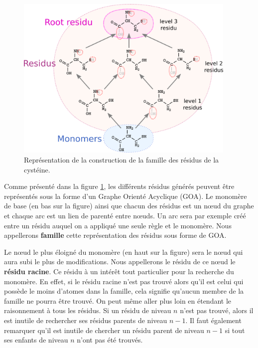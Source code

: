 \begin{figure}[!ht]
  \begin{center}
    \includegraphics[width=400px]{Figures/s2m/residues/cystein_family.png}
    \caption{\label{family}Représentation de la construction de la famille des résidus de la cystéine.}
  \end{center}
\end{figure}

Comme présenté dans la figure \ref{family}, les différents résidus générés peuvent être représentés sous la forme d'un Graphe Orienté Acyclique (GOA).
Le monomère de base (en bas sur la figure) ainsi que chacun des résidus est un n\oe{}ud du graphe et chaque arc est un lien de parenté entre n\oe{}uds.
Un arc sera par exemple créé entre un résidu auquel on a appliqué une seule règle et le monomère.
Nous appellerons \textbf{famille} cette représentation des résidus sous forme de GOA.

Le n\oe{}ud le plus éloigné du monomère (en haut sur la figure) sera le n\oe{}ud qui aura subi le plus de modifications.
Nous appellerons le résidu de ce n\oe{}ud le \textbf{résidu racine}.
Ce résidu à un intérêt tout particulier pour la recherche du monomère.
En effet, si le résidu racine n'est pas trouvé alors qu'il est celui qui possède le moins d'atomes dans la famille, cela signifie qu'aucun membre de la famille ne pourra être trouvé.
On peut même aller plus loin en étendant le raisonnement à tous les résidus.
Si un résidu de niveau $n$ n'est pas trouvé, alors il est inutile de rechercher ses résidus parents de niveau $n-1$.
Il faut également remarquer qu'il est inutile de chercher un résidu parent de niveau $n-1$ si tout ses enfants de niveau $n$ n'ont pas été trouvés.

